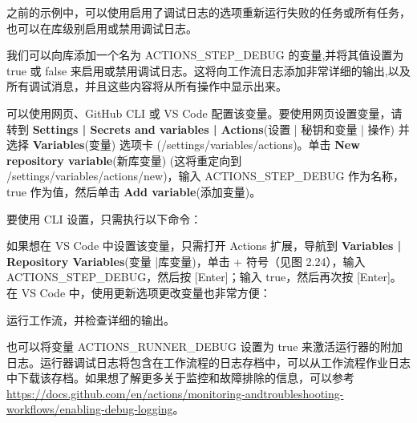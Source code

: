 
之前的示例中，可以使用启用了调试日志的选项重新运行失败的任务或所有任务，也可以在库级别启用或禁用调试日志。


我们可以向库添加一个名为 ACTIONS\_STEP\_DEBUG 的变量,并将其值设置为 true 或 false 来启用或禁用调试日志。这将向工作流日志添加非常详细的输出,以及所有调试消息，并且这些内容将从所有操作中显示出来。

可以使用网页、GitHub CLI 或 VS Code 配置该变量。要使用网页设置变量，请转到 \textbf{Settings | Secrets and variables | Actions}(设置 | 秘钥和变量 | 操作) 并选择 \textbf{Variables}(变量) 选项卡 (/settings/variables/actions)。单击 \textbf{New repository variable}(新库变量) (这将重定向到 /settings/variables/actions/new)，输入 ACTIONS\_STEP\_DEBUG 作为名称，true 作为值，然后单击 \textbf{Add variable}(添加变量)。

要使用 CLI 设置，只需执行以下命令：


如果想在 VS Code 中设置该变量，只需打开 Actions 扩展，导航到 \textbf{Variables | Repository Variables}(变量 |库变量)，单击 + 符号（见图 2.24），输入 ACTIONS\_STEP\_DEBUG，然后按 [Enter]；输入 true，然后再次按 [Enter]。在 VS Code 中，使用更新选项更改变量也非常方便：


运行工作流，并检查详细的输出。


也可以将变量 ACTIONS\_RUNNER\_DEBUG 设置为 true 来激活运行器的附加日志。运行器调试日志将包含在工作流程的日志存档中，可以从工作流程作业日志中下载该存档。如果想了解更多关于监控和故障排除的信息，可以参考\url{https://docs.github.com/en/actions/monitoring-andtroubleshooting-workflows/enabling-debug-logging}。